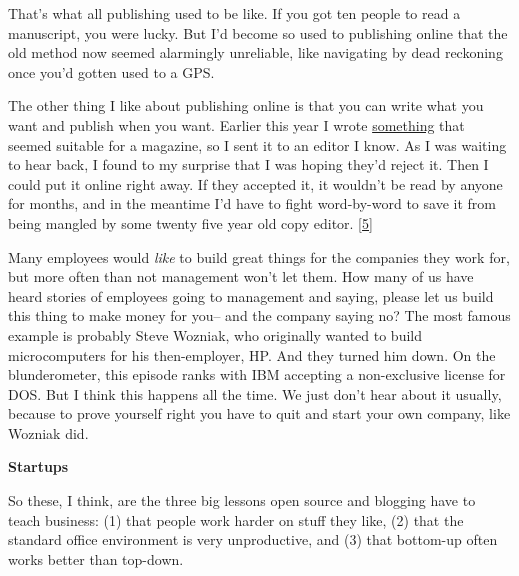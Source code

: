 That's
                  what all publishing used to be like. If you got ten people to
                  read a manuscript, you were lucky. But I'd become so used to
                  publishing online that the old method now seemed alarmingly
                  unreliable, like navigating by dead reckoning once you'd
                  gotten used to a GPS.

The other thing I like about
                  publishing online is that you can write what you want and
                  publish when you want. Earlier this year I wrote
                  \href{http://www.paulgraham.com/inequality.html}{something} that seemed suitable
                  for a magazine, so I sent it to an editor I know. As I was
                  waiting to hear back, I found to my surprise that I was hoping
                  they'd reject it. Then I could put it online right away. If
                  they accepted it, it wouldn't be read by anyone for months,
                  and in the meantime I'd have to fight word-by-word to save it
                  from being mangled by some twenty five year old copy editor.
                  [\href{\#f5n}{5}]

Many employees would \emph{like} to build great
                  things for the companies they work for, but more often than
                  not management won't let them. How many of us have heard
                  stories of employees going to management and saying, please
                  let us build this thing to make money for you-- and the
                  company saying no? The most famous example is probably Steve
                  Wozniak, who originally wanted to build microcomputers for his
                  then-employer, HP. And they turned him down. On the
                  blunderometer, this episode ranks with IBM accepting a
                  non-exclusive license for DOS. But I think this happens all
                  the time. We just don't hear about it usually, because to
                  prove yourself right you have to quit and start your own
                  company, like Wozniak did.

\textbf{Startups}

So these, I think, are the three big lessons open
                  source and blogging have to teach business: (1) that people
                  work harder on stuff they like, (2) that the standard office
                  environment is very unproductive, and (3) that bottom-up often
                  works better than top-down.

